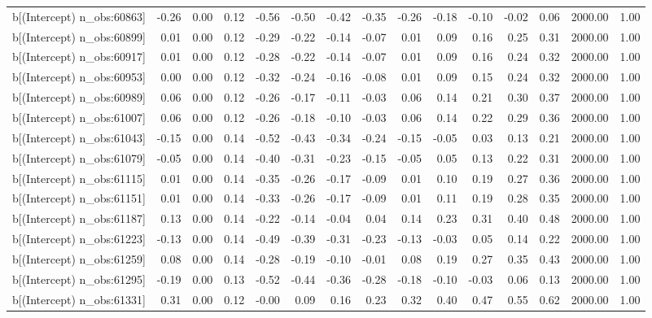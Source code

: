 \begin{table}[ht]
\begin{tabular}{rrrrrrrrrrrrrrr}
  b[(Intercept) n\_obs:60863] & -0.26 & 0.00 & 0.12 & -0.56 & -0.50 & -0.42 & -0.35 & -0.26 & -0.18 & -0.10 & -0.02 & 0.06 & 2000.00 & 1.00 \\ 
  b[(Intercept) n\_obs:60899] & 0.01 & 0.00 & 0.12 & -0.29 & -0.22 & -0.14 & -0.07 & 0.01 & 0.09 & 0.16 & 0.25 & 0.31 & 2000.00 & 1.00 \\ 
  b[(Intercept) n\_obs:60917] & 0.01 & 0.00 & 0.12 & -0.28 & -0.22 & -0.14 & -0.07 & 0.01 & 0.09 & 0.16 & 0.24 & 0.32 & 2000.00 & 1.00 \\ 
  b[(Intercept) n\_obs:60953] & 0.00 & 0.00 & 0.12 & -0.32 & -0.24 & -0.16 & -0.08 & 0.01 & 0.09 & 0.15 & 0.24 & 0.32 & 2000.00 & 1.00 \\ 
  b[(Intercept) n\_obs:60989] & 0.06 & 0.00 & 0.12 & -0.26 & -0.17 & -0.11 & -0.03 & 0.06 & 0.14 & 0.21 & 0.30 & 0.37 & 2000.00 & 1.00 \\ 
  b[(Intercept) n\_obs:61007] & 0.06 & 0.00 & 0.12 & -0.26 & -0.18 & -0.10 & -0.03 & 0.06 & 0.14 & 0.22 & 0.29 & 0.36 & 2000.00 & 1.00 \\ 
  b[(Intercept) n\_obs:61043] & -0.15 & 0.00 & 0.14 & -0.52 & -0.43 & -0.34 & -0.24 & -0.15 & -0.05 & 0.03 & 0.13 & 0.21 & 2000.00 & 1.00 \\ 
  b[(Intercept) n\_obs:61079] & -0.05 & 0.00 & 0.14 & -0.40 & -0.31 & -0.23 & -0.15 & -0.05 & 0.05 & 0.13 & 0.22 & 0.31 & 2000.00 & 1.00 \\ 
  b[(Intercept) n\_obs:61115] & 0.01 & 0.00 & 0.14 & -0.35 & -0.26 & -0.17 & -0.09 & 0.01 & 0.10 & 0.19 & 0.27 & 0.36 & 2000.00 & 1.00 \\ 
  b[(Intercept) n\_obs:61151] & 0.01 & 0.00 & 0.14 & -0.33 & -0.26 & -0.17 & -0.09 & 0.01 & 0.11 & 0.19 & 0.28 & 0.35 & 2000.00 & 1.00 \\ 
  b[(Intercept) n\_obs:61187] & 0.13 & 0.00 & 0.14 & -0.22 & -0.14 & -0.04 & 0.04 & 0.14 & 0.23 & 0.31 & 0.40 & 0.48 & 2000.00 & 1.00 \\ 
  b[(Intercept) n\_obs:61223] & -0.13 & 0.00 & 0.14 & -0.49 & -0.39 & -0.31 & -0.23 & -0.13 & -0.03 & 0.05 & 0.14 & 0.22 & 2000.00 & 1.00 \\ 
  b[(Intercept) n\_obs:61259] & 0.08 & 0.00 & 0.14 & -0.28 & -0.19 & -0.10 & -0.01 & 0.08 & 0.19 & 0.27 & 0.35 & 0.43 & 2000.00 & 1.00 \\ 
  b[(Intercept) n\_obs:61295] & -0.19 & 0.00 & 0.13 & -0.52 & -0.44 & -0.36 & -0.28 & -0.18 & -0.10 & -0.03 & 0.06 & 0.13 & 2000.00 & 1.00 \\ 
  b[(Intercept) n\_obs:61331] & 0.31 & 0.00 & 0.12 & -0.00 & 0.09 & 0.16 & 0.23 & 0.32 & 0.40 & 0.47 & 0.55 & 0.62 & 2000.00 & 1.00 \\ 

\end{tabular}
\end{table}
